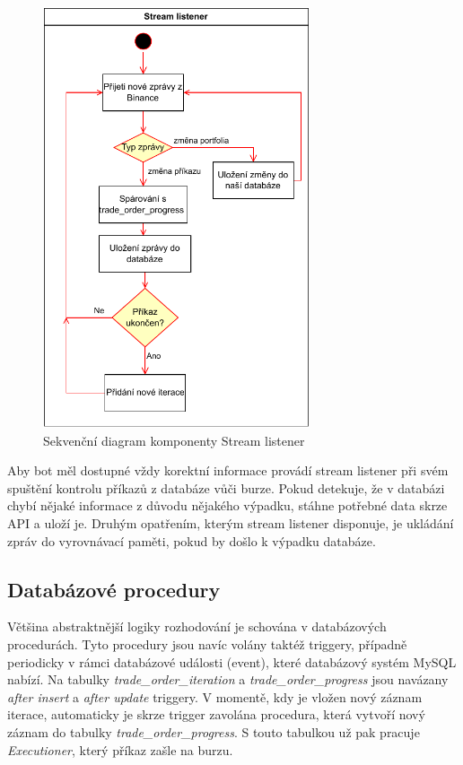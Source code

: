 \begin{figure}
    \centering
    \includegraphics[width=0.7\textwidth]{Figures/listener.pdf}
    \caption{Sekvenční diagram komponenty Stream listener}
    \label{figure:listener}
\end{figure}

Aby bot měl dostupné vždy korektní informace provádí stream listener při svém spuštění kontrolu příkazů z databáze vůči burze. Pokud detekuje, že v databázi chybí nějaké informace z důvodu nějakého výpadku,
stáhne potřebné data skrze API a uloží je. Druhým opatřením, kterým stream listener disponuje, je ukládání zpráv do vyrovnávací paměti, pokud by došlo k výpadku databáze.


\subsection{Databázové procedury}
Většina abstraktnější logiky rozhodování je schována v databázových procedurách. Tyto procedury jsou navíc volány taktéž triggery, případně periodicky v rámci databázové události (event), které
databázový systém MySQL nabízí. Na tabulky \emph{trade\_order\_iteration} a \emph{trade\_order\_progress} jsou navázany \emph{after insert} a \emph{after update} triggery. V momentě, kdy je vložen
nový záznam iterace, automaticky je skrze trigger zavolána procedura, která vytvoří nový záznam do tabulky \emph{trade\_order\_progress}. S touto tabulkou už pak pracuje \emph{Executioner}, který
příkaz zašle na burzu.

